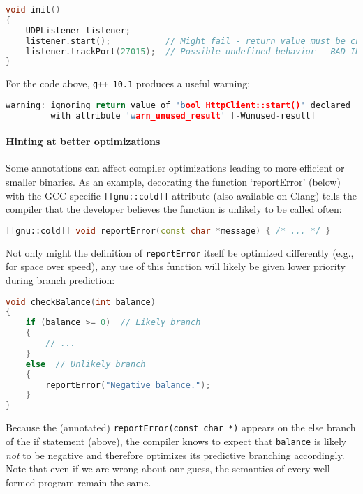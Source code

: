 \documentclass[twoside,10pt,letterpaper,usenames]{newstyle-PearsonGeneric-7-38}
\begin{document}
\begin{lstlisting}[language=C++]
void init()
{
    UDPListener listener;
    listener.start();           // Might fail - return value must be checked!
    listener.trackPort(27015);  // Possible undefined behavior - BAD IDEA!
}
\end{lstlisting}
    

For the code above, \texttt{g++}~\texttt{10.1} produces a useful
warning:

\begin{lstlisting}[language=C++]
warning: ignoring return value of 'bool HttpClient::start()' declared
         with attribute 'warn_unused_result' [-Wunused-result]
\end{lstlisting}
    

\paragraph[Hinting at better optimizations]{Hinting at better optimizations}\label{hinting-at-better-optimizations}

Some annotations can affect compiler optimizations leading to more
efficient or smaller binaries. As an example, decorating the function
`reportError' (below) with the GCC-specific \texttt{[[gnu::cold]]}
attribute (also available on Clang) tells the compiler that the
developer believes the function is unlikely to be called often:

\begin{lstlisting}[language=C++]
[[gnu::cold]] void reportError(const char *message) { /* ... */ }
\end{lstlisting}
    

Not only might the definition of \texttt{reportError} itself be
optimized differently (e.g., for space over speed), any use of this
function will likely be given lower priority during branch prediction:

\begin{lstlisting}[language=C++]
void checkBalance(int balance)
{
    if (balance >= 0)  // Likely branch
    {
        // ...
    }
    else  // Unlikely branch
    {
        reportError("Negative balance.");
    }
}
\end{lstlisting}
    

Because the (annotated)
\texttt{reportError(const}~\texttt{char}~\texttt{*)} appears on the else
branch of the if statement (above), the compiler knows to expect that
\texttt{balance} is likely \emph{not} to be negative and therefore
optimizes its predictive branching accordingly. Note that even if we are
wrong about our guess, the semantics of every well-formed program remain
the same.
\end{document}
